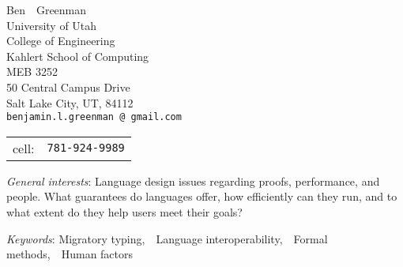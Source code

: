 \documentclass[11pt]{article}
\makeatletter
\renewcommand{\maketitle}{
\begin{center}
  {\large{Ben~~Greenman}}
  \\ University of Utah
  \\ College of Engineering
  \\ Kahlert School of Computing
  \\ MEB 3252
  \\ 50 Central Campus Drive
  \\ Salt Lake City, UT, 84112
\vspace{0.1cm}
\\\texttt{\footnotesize benjamin.l.greenman\,@\,gmail.com}
  \\{\footnotesize\begin{tabular}{r@{~~}l} \\[-2ex]
    cell: & \texttt{781-924-9989}
  \end{tabular}}
\end{center}
}
\makeatother
\begin{document}
\maketitle


\newcommand{\interestpar}[2]{\noindent\emph{#1}\/: #2}
\newcommand{\isep}{,~~}

\interestpar{General interests}{
Language design
issues regarding
proofs, performance, and people.
What guarantees do languages offer,
how efficiently can they run,
and to what extent do they help users meet their goals?
}

\interestpar{Keywords}{Migratory typing\isep{}Language interoperability\isep{}Formal methods\isep{}Human factors}

\end{document}

